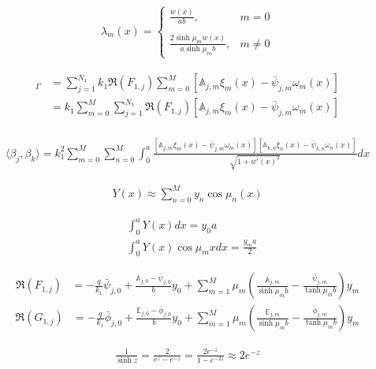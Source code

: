 \begin{align}
\lambda_m(x) = \left\lbrace
\begin{array}{ll}
\displaystyle \frac{w(x)}{ab}, & m = 0 \\ \nonumber \\
\displaystyle \frac{2\sinh\mu_m w(x)}{a\sinh\mu_m b}, & m \ne 0
\end{array}
\right.
\end{align}

\begin{align}
[T_1 - T_2]_\Gamma & = \sum_{j=1}^{N_1} k_1 \Re(F_{1,j}) \sum_{m=0}^M [\mathbb{A}_{j,m}\xi_m(x) - \bar{\psi}_{j, m}\omega_m(x)] \nonumber \\
& = k_1 \sum_{m=0}^M \sum_{j=1}^{N_1} \Re(F_{1,j}) [\mathbb{A}_{j,m}\xi_m(x) - \bar{\psi}_{j, m}\omega_m(x)] \nonumber \\
\end{align}

\begin{align}
\langle \beta_j, \beta_k\rangle = k_1^2 \sum_{m=0}^M \sum_{n=0}^M \int_0^a \frac{[\mathbb{A}_{j,m}\xi_m(x) - \bar{\psi}_{j, m}\omega_m(x)][\mathbb{A}_{k,n}\xi_n(x) - \bar{\psi}_{k, n}\omega_n(x)]}{\sqrt{1 + w'(x)^2}} dx
\end{align}

\newpage

\begin{align}
Y(x) \approx \sum_{n=0}^M y_n \cos \mu_n(x)
\end{align}

\begin{align}
& \int_0^a Y(x) dx = y_0 a \nonumber \\
& \int_0^a Y(x) \cos\mu_m x dx = \frac{y_m a}{2}
\end{align}

\begin{align}
\Re(F_{1,j})
& =
-\frac{q}{k_1}\bar{\psi}_{j,0} + \frac{\mathbb{A}_{j,0} - \bar{\psi}_{j,0}}{b}y_0 + 
\sum_{m=1}^M \mu_m \left(\frac{\mathbb{A}_{j,m}}{\sinh\mu_m b} - \frac{\bar{\psi}_{j, m}}{\tanh\mu_m b}\right)y_m
\end{align}
%
\begin{align}
\Re(G_{1,j})
& =
-\frac{q}{k_1}\bar{\phi}_{j,0} + \frac{\mathbb{E}_{j,0} - \bar{\phi}_{j,0}}{b}y_0 + 
\sum_{m=1}^M \mu_m \left(\frac{\mathbb{E}_{j,m}}{\sinh\mu_m b} - \frac{\bar{\phi}_{j, m}}{\tanh\mu_m b}\right)y_m
\end{align}

\begin{align}
\frac{1}{\sinh z} = \frac{2}{e^z - e^{-z}} = \frac{2e^{-z}}{1 - e^{-2z}} \approx 2e^{-z}
\end{align}

